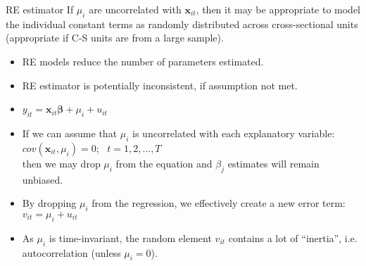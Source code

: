 \documentclass{beamer}
\begin{document}
\begin{frame}{RE estimator}
If $\mu_i$ are uncorrelated with $\bm{x}_{it}$, then it may be appropriate to model the individual constant terms as randomly distributed across cross-sectional units (appropriate if C-S units are from a large sample).
\bigskip

\begin{itemize}
\item RE models reduce the number of parameters estimated.
\item RE estimator is potentially inconsistent, if assumption not met.
\item $y_{it} = \bm{x}_{it} \bm{\beta} + \mu_i + u_{it}$\\
\item If we can assume that $\mu_i$ is uncorrelated with each explanatory variable: $\textit{cov}(\bm{x}_{it}, \mu_i) = 0$; \ $t = 1,2, \dots, T$ \\then we may drop $\mu_i$ from the equation and $\beta_j$ estimates will remain unbiased.\\
\item By dropping $\mu_i$ from the regression, we effectively create a new error term: $v_{it} = \mu_i + u_{it}$\\
\medskip
\item As $\mu_i$ is time-invariant, the random element $v_{it}$ contains a lot of ``inertia'', i.e. autocorrelation (unless $\mu_i = 0$).
\end{itemize}
\end{frame}
\end{document}

